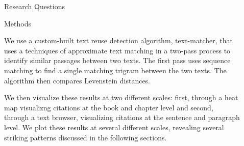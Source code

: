 \documentclass[final]{beamer}
\newlength{\sepwid}
\newlength{\onecolwid}
\newlength{\twocolwid}
\begin{document}
\begin{frame}[t]
\begin{columns}[t]
\begin{column}{\onecolwid}
\begin{alertblock}{Research Questions}
\end{alertblock}


\begin{block}{Methods}

We use a custom-built text reuse detection algorithm, text-matcher, that uses a techniques of approximate text matching in a two-pass process to identify similar passages between two texts. The first pass uses sequence matching to find a single matching trigram between the two texts. The algorithm then compares Levenstein  distances.

We then visualize these results at two different  scales: first, through a heat map visualizng citations at the book and chapter level and second, through a text browser, visualizing citations at the sentence and paragraph level.  We plot these results at several different scales, revealing several striking patterns discussed in the following sections.  


\end{block}






\end{column} %

\begin{column}{\sepwid}\end{column} %

\begin{column}{\twocolwid} %

\begin{columns}[t,totalwidth=\twocolwid] %

\begin{column}{\onecolwid}\vspace{-.6in} %



\end{column}
\end{columns}
\end{column}
\end{columns}
\end{frame}
\end{document}
